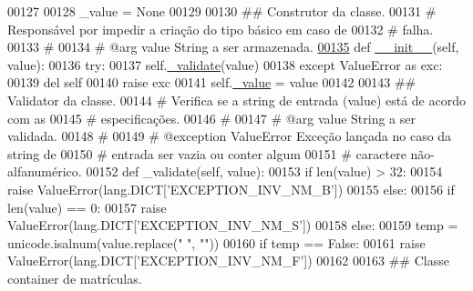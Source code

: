 \begin{DoxyCode}
00127 
00128     \_value = \textcolor{keywordtype}{None}
00129 
00130     \textcolor{comment}{## Construtor da classe.}
00131     \textcolor{comment}{#   Responsável por impedir a criação do tipo básico em caso de}
00132     \textcolor{comment}{#   falha.}
00133     \textcolor{comment}{#}
00134     \textcolor{comment}{#   @arg value String a ser armazenada.}
\hypertarget{BaseUnit_8py_source_l00135}{}\hyperlink{classELO_1_1BaseUnit_1_1Name_aaf1d0873e339b23b588a539d0aa6acaf}{00135}     \textcolor{keyword}{def }\hyperlink{classELO_1_1BaseUnit_1_1Name_aaf1d0873e339b23b588a539d0aa6acaf}{\_\_init\_\_}(self, value):
00136         \textcolor{keywordflow}{try}:
00137             self.\hyperlink{classELO_1_1BaseUnit_1_1IfBaseType_acf84c5906a39b605a23ab68c4ca1dd19}{\_validate}(value)
00138         \textcolor{keywordflow}{except} ValueError \textcolor{keyword}{as} exc:
00139             del self
00140             \textcolor{keywordflow}{raise} exc
00141         self.\hyperlink{classELO_1_1BaseUnit_1_1IfBaseType_ad05d9d377fc4b99743c022cc8f6019d7}{\_value} = value
00142 
00143     \textcolor{comment}{## Validator da classe.}
00144     \textcolor{comment}{#   Verifica se a string de entrada (value) está de acordo com as}
00145     \textcolor{comment}{#   especificações.}
00146     \textcolor{comment}{#}
00147     \textcolor{comment}{#   @arg       value        String a ser validada.}
00148     \textcolor{comment}{#}
00149     \textcolor{comment}{#   @exception ValueError   Exceção lançada no caso da string de}
00150     \textcolor{comment}{#                           entrada ser vazia ou conter algum}
00151     \textcolor{comment}{#                           caractere não-alfanumérico.}
00152     \textcolor{keyword}{def }\_validate(self, value):
00153         \textcolor{keywordflow}{if} len(value) > 32:
00154             \textcolor{keywordflow}{raise} ValueError(lang.DICT[\textcolor{stringliteral}{'EXCEPTION\_INV\_NM\_B'}])
00155         \textcolor{keywordflow}{else}: 
00156             \textcolor{keywordflow}{if} len(value) == 0:
00157                 \textcolor{keywordflow}{raise} ValueError(lang.DICT[\textcolor{stringliteral}{'EXCEPTION\_INV\_NM\_S'}])
00158             \textcolor{keywordflow}{else}:
00159                 temp = unicode.isalnum(value.replace(\textcolor{stringliteral}{" "}, \textcolor{stringliteral}{""}))
00160                 \textcolor{keywordflow}{if} temp == \textcolor{keyword}{False}:
00161                     \textcolor{keywordflow}{raise} ValueError(lang.DICT[\textcolor{stringliteral}{'EXCEPTION\_INV\_NM\_F'}])
00162 
00163 \textcolor{comment}{## Classe container de matrículas.}

\end{DoxyCode}
